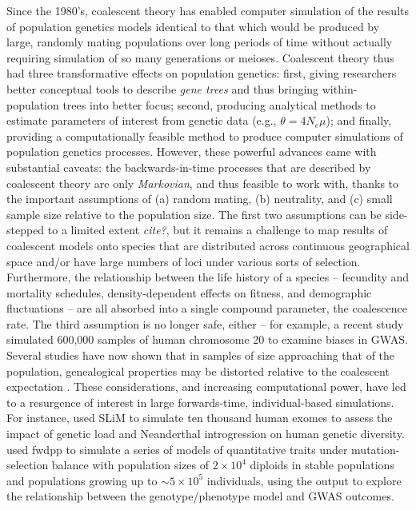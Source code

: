 \documentclass{article}
\newcommand{\jda}[1]{{\em \color{cyan} #1}}
\begin{document}
Since the 1980's, coalescent theory has enabled computer simulation of the results of population genetics models
identical to that which would be produced by large, randomly mating populations over long periods of time
without actually requiring simulation of so many generations or meioses.
Coalescent theory thus had three transformative effects on population genetics:
first, giving researchers better conceptual tools to describe \emph{gene trees} and thus bringing within-population trees into better focus;
second, producing analytical methods to estimate parameters of interest from genetic data (e.g., $\theta = 4N_e \mu$);
and finally, providing a computationally feasible method to produce computer simulations of population genetics processes.
However, these powerful advances came with substantial caveats:
the backwards-in-time processes that are described by coalescent theory
are only \emph{Markovian}, and thus feasible to work with,
thanks to the important assumptions of
(a) random mating,
(b) neutrality,
and (c) small sample size relative to the population size.
The first two assumptions can be side-stepped to a limited extent \jda{cite?},
but it remains a challenge to map results of coalescent models
onto species that are distributed across continuous geographical space
and/or have large numbers of loci under various sorts of selection.
Furthermore, the relationship between the life history of a species --
fecundity and mortality schedules, density-dependent effects on fitness, and demographic fluctuations --
are all absorbed into a single compound parameter, the coalescence rate.
The third assumption is no longer safe, either --
for example, a recent study~\citep{martin2017human}
simulated 600,000 samples of human chromosome 20 to examine biases in GWAS.
Several studies have now shown that in samples of size approaching that of the population,
genealogical properties may be distorted relative to the coalescent expectation
\citep{wakeley2003gene,maruvka2011recovering,bhaskar2014distortion}.
These considerations, and increasing computational power, have led to a resurgence of
interest in large forwards-time, individual-based simulations.
For instance, \citet{harris2016genetic} used SLiM \citep{slim} to simulate ten thousand human exomes
to assess the impact of genetic load and Neanderthal introgression on human genetic diversity.
\cite{Sanjak2017-ko} used
fwdpp \citep{fwdpp} to simulate a series of models of quantitative traits under mutation-selection balance with
population sizes of $2 \times 10^4$ diploids in stable populations and populations growing up to $\sim 5
\times 10^5$ individuals, using the output to explore the relationship between the genotype/phenotype model and GWAS
outcomes.
\end{document}
